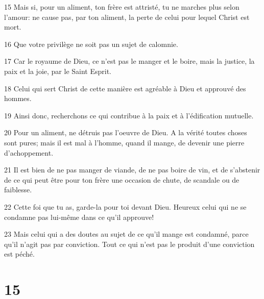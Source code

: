 \par 15 Mais si, pour un aliment, ton frère est attristé, tu ne marches plus selon l'amour: ne cause pas, par ton aliment, la perte de celui pour lequel Christ est mort.
\par 16 Que votre privilège ne soit pas un sujet de calomnie.
\par 17 Car le royaume de Dieu, ce n'est pas le manger et le boire, mais la justice, la paix et la joie, par le Saint Esprit.
\par 18 Celui qui sert Christ de cette manière est agréable à Dieu et approuvé des hommes.
\par 19 Ainsi donc, recherchons ce qui contribue à la paix et à l'édification mutuelle.
\par 20 Pour un aliment, ne détruis pas l'oeuvre de Dieu. A la vérité toutes choses sont pures; mais il est mal à l'homme, quand il mange, de devenir une pierre d'achoppement.
\par 21 Il est bien de ne pas manger de viande, de ne pas boire de vin, et de s'abstenir de ce qui peut être pour ton frère une occasion de chute, de scandale ou de faiblesse.
\par 22 Cette foi que tu as, garde-la pour toi devant Dieu. Heureux celui qui ne se condamne pas lui-même dans ce qu'il approuve!
\par 23 Mais celui qui a des doutes au sujet de ce qu'il mange est condamné, parce qu'il n'agit pas par conviction. Tout ce qui n'est pas le produit d'une conviction est péché.

\chapter{15}

